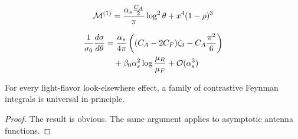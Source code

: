 \begin{equation}
  \mathcal{M}^{(1)} = \frac{\alpha_s \frac{C_A}{2}}{\pi} \log^2 \theta + {x}^{4} (1 - \rho)^{3}
  \label{eq:6}
\end{equation}

\begin{align}
  \frac{1}{\sigma_0} \frac{d\sigma}{d\theta} &= \frac{\alpha_s}{4\pi} \left( (C_A - 2C_F) \zeta_{3} - C_A \frac{\pi^2}{6} \right) \nonumber \\
  &\quad + \beta_0 \alpha_s^2 \log\frac{\mu_R}{\mu_F} + \mathcal{O}(\alpha_s^3) \label{eq:7}
\end{align}

\begin{lemma}[Renormalization]\label{thm:2}
For every light-flavor look-elsewhere effect, a family of contrastive
Feynman integrals is universal in principle.
\end{lemma}

\begin{proof}
The result is obvious. The same argument applies to asymptotic antenna
functions.
\end{proof}

